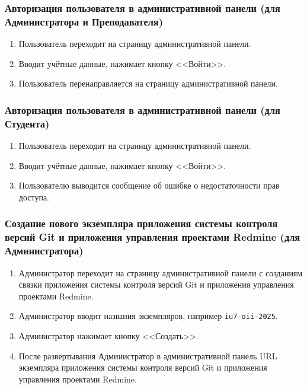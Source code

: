 \subsubsection*{Авторизация пользователя в административной панели (для Администратора и Преподавателя)}
\begin{enumerate}
\item Пользователь переходит на страницу административной панели.
\item Вводит учётные данные, нажимает кнопку <<Войти>>.
\item Пользователь перенаправляется на страницу административной панели.
\end{enumerate}

\subsubsection*{Авторизация пользователя в административной панели (для Студента)}
\begin{enumerate}
	\item Пользователь переходит на страницу административной панели.
	\item Вводит учётные данные, нажимает кнопку <<Войти>>.
	\item Пользователю выводится сообщение об ошибке о недостаточности прав доступа.
\end{enumerate}

\subsubsection*{Создание нового экземпляра приложения системы контроля версий Git и приложения управления проектами Redmine (для Администратора)}
\begin{enumerate}
\item Администратор переходит на страницу административной панели с созданиям связки приложения системы контроля версий Git и приложения управления проектами Redmine.
\item Администратор вводит названия экземпляров, например \texttt{iu7-oii-2025}.
\item Администратор нажимает кнопку <<Создать>>.
\item После развертывания Администратор в административной панель URL экземпляра приложения системы контроля версий Git и приложения управления проектами Redmine.
\end{enumerate}

